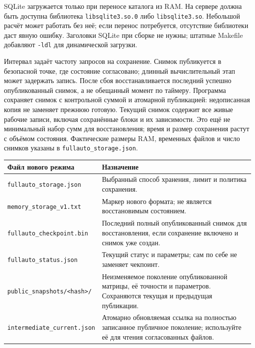 SQLite загружается только при переносе каталога из RAM. На сервере
должна быть доступна библиотека \texttt{libsqlite3.so.0} либо
\texttt{libsqlite3.so}. Небольшой расчёт может работать без неё; если
перенос потребуется, отсутствие библиотеки даст явную ошибку. Заголовки
SQLite при сборке не нужны; штатные Makefile добавляют \texttt{-ldl} для
динамической загрузки.

Интервал задаёт частоту запросов на сохранение. Снимок публикуется в
безопасной точке, где состояние согласовано; длинный вычислительный этап
может задержать запись. После сбоя восстанавливается последний успешно
опубликованный снимок, а не обещанный момент по таймеру. Программа
сохраняет снимок с контрольной суммой и атомарной публикацией:
недописанная копия не заменяет прежнюю готовую. Текущий снимок содержит
все живые рабочие записи, включая сохранённые блоки и их зависимости.
Это ещё не минимальный набор сумм для восстановления; время и размер
сохранения растут с объёмом состояния. Фактические размеры RAM,
временных файлов и число снимков указаны в
\nolinkurl{fullauto_storage.json}.

\begin{longtable}[]{@{}
  >{\raggedright\arraybackslash}p{}
  >{\raggedright\arraybackslash}p{}@{}}
\toprule\noalign{}
\begin{minipage}[b]{\linewidth}\raggedright
Файл нового режима
\end{minipage} & \begin{minipage}[b]{\linewidth}\raggedright
Назначение
\end{minipage} \\
\midrule\noalign{}
\endhead
\bottomrule\noalign{}
\endlastfoot
\nolinkurl{fullauto_storage.json} & Выбранный способ хранения, лимит и
политика сохранения. \\
\nolinkurl{memory_storage_v1.txt} & Маркер нового формата; не является
восстановимым состоянием. \\
\nolinkurl{fullauto_checkpoint.bin} & Последний полный опубликованный
снимок для восстановления, если сохранение включено и снимок уже
создан. \\
\nolinkurl{fullauto_status.json} & Текущий статус и параметры; сам по себе
не заменяет чекпоинт. \\
\texttt{public\_snapshots/\textless{}hash\textgreater{}/} & Неизменяемое
поколение опубликованной матрицы, её точности и параметров. Сохраняются
текущая и предыдущая публикации. \\
\nolinkurl{intermediate_current.json} & Атомарно обновляемая ссылка на
полностью записанное публичное поколение; используйте её для чтения
согласованных файлов. \\
\end{longtable}

